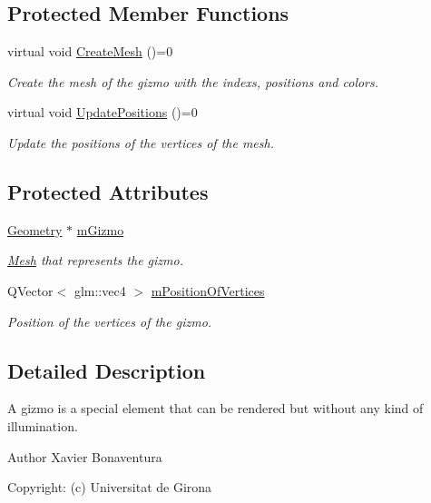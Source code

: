 \subsection*{Protected Member Functions}
\begin{DoxyCompactItemize}
\item 
virtual void \hyperlink{class_gizmo_a4ba36c75e6b8c2f729792de0161f5532}{Create\+Mesh} ()=0
\begin{DoxyCompactList}\small\item\em Create the mesh of the gizmo with the indexs, positions and colors. \end{DoxyCompactList}\item 
virtual void \hyperlink{class_gizmo_a30161525d80402eb0653f2612003a733}{Update\+Positions} ()=0
\begin{DoxyCompactList}\small\item\em Update the positions of the vertices of the mesh. \end{DoxyCompactList}\end{DoxyCompactItemize}
\subsection*{Protected Attributes}
\begin{DoxyCompactItemize}
\item 
\hyperlink{class_geometry}{Geometry} $\ast$ \hyperlink{class_gizmo_af458aa807ec26bd57dc3a58024dc5e5e}{m\+Gizmo}
\begin{DoxyCompactList}\small\item\em \hyperlink{class_mesh}{Mesh} that represents the gizmo. \end{DoxyCompactList}\item 
Q\+Vector$<$ glm\+::vec4 $>$ \hyperlink{class_gizmo_ae6e4173865120b76bf530f5f0ee8ec43}{m\+Position\+Of\+Vertices}
\begin{DoxyCompactList}\small\item\em Position of the vertices of the gizmo. \end{DoxyCompactList}\end{DoxyCompactItemize}


\subsection{Detailed Description}
A gizmo is a special element that can be rendered but without any kind of illumination. 

\begin{DoxyAuthor}{Author}
Xavier Bonaventura 

Copyright\+: (c) Universitat de Girona 
\end{DoxyAuthor}



